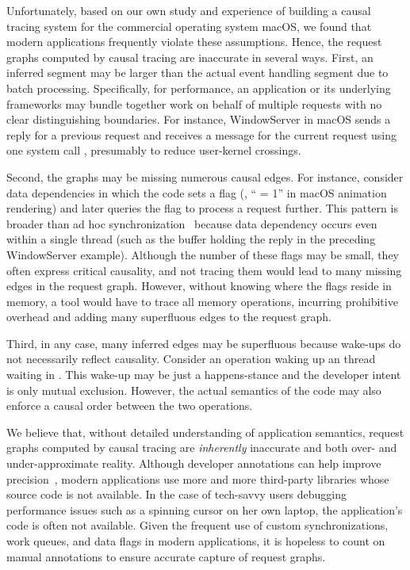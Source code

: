 Unfortunately, based on our own study and experience of building a causal
tracing system for the commercial operating system macOS, we found that modern
applications frequently violate these assumptions. Hence, the request graphs
computed by causal tracing are inaccurate in several ways. First, an inferred
segment may be larger than the actual event handling segment due to batch
processing. Specifically, for performance, an application or its underlying
frameworks may bundle together work on behalf of multiple requests with no clear
distinguishing boundaries. For instance, WindowServer in macOS sends a reply
for a previous request and receives a message for the current request using one
system call , presumably to reduce user-kernel
crossings.

Second, the graphs may be missing numerous causal edges. For instance, consider
data dependencies in which the code sets a flag (\eg, `` = 1''
in macOS animation rendering) and later queries the flag to process a request
further. This pattern is broader than ad hoc synchronization~\cite{xiong2010ad}
because data dependency occurs even within a single thread (such as the buffer
holding the reply in the preceding WindowServer example). Although the number of
these flags may be small, they often express critical causality, and not tracing
them would lead to many missing edges in the request graph. However, without
knowing where the flags reside in memory, a tool would have to trace all memory
operations, incurring prohibitive overhead and adding many superfluous edges to
the request graph.

Third, in any case, many inferred edges may be superfluous because wake-ups do
not necessarily reflect causality. Consider an  operation waking up
an thread waiting in . This wake-up may be just a happens-stance and
the developer intent is only mutual exclusion. However, the actual semantics of
the code may also enforce a causal order between the two operations.

We believe that, without detailed understanding of application semantics,
request graphs computed by causal tracing are \emph{inherently} inaccurate
and both over- and under-approximate reality. Although developer annotations
can help improve precision~\cite{barham2004using, reynolds2006pip}, modern
applications use more and more third-party libraries whose source code is not
available. In the case of tech-savvy users debugging performance issues such
as a spinning cursor on her own laptop, the application's code is often not
available. Given the frequent use of custom synchronizations, work queues, and
data flags in modern applications, it is hopeless to count on manual annotations
to ensure accurate capture of request graphs.

